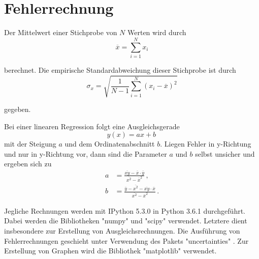 \section{Fehlerrechnung}
\label{sec:Fehlerrechnung}
Der Mittelwert einer Stichprobe von $N$ Werten wird durch
\begin{equation}
  \overline{x} = \sum\limits_{i = 1}^N x_i
  \label{eqn:mean}
\end{equation}

berechnet.
Die empirische Standardabweichung dieser Stichprobe ist durch
\begin{equation}
  \sigma_x = \sqrt{\frac{1}{N-1}
    \sum\limits_{i = 1}^N
    (x_i-\overline{x})^2}
    \label{eqn:std}
\end{equation}

gegeben.

Bei einer linearen Regression folgt eine Ausgleichsgerade
\begin{equation}
  y(x) = ax+b\,
\end{equation}
mit der Steigung $a$ und dem Ordinatenabschnitt $b$. Liegen Fehler in y-Richtung
und nur in y-Richtung vor, dann sind die Parameter $a$ und $b$ selbst unsicher
und ergeben sich zu
\begin{align}
  a &= \frac{\overline{xy}-\overline{x} \cdot \overline{y}}{\overline{x^2}-\overline{x}^2}\,,\\
  b &= \frac{\overline{y}-\overline{x^2}-\overline{xy} \cdot \overline{x}}{\overline{x^2}-\overline{x}^2}\,.
\end{align}


Jegliche Rechnungen werden mit IPython 5.3.0 in Python 3.6.1 durchgeführt. Dabei
werden die Bibliotheken "numpy" \cite{numpy} und "scipy" \cite{scipy} verwendet.
Letztere dient insbesondere zur Erstellung von Ausgleichsrechnungen.
Die Ausführung von Fehlerrechnungen geschieht unter Verwendung des Pakets
"uncertainties" \cite{uncertainties}. Zur Erstellung von Graphen wird die Bibliothek
"matplotlib" \cite{matplotlib} verwendet.
